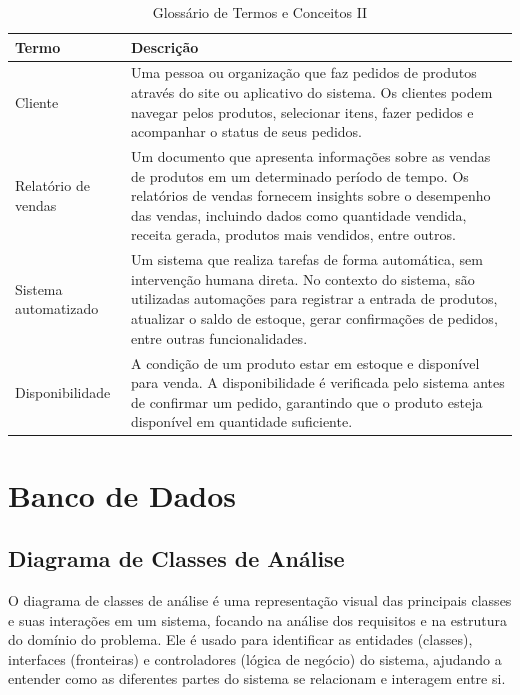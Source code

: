 \documentclass[
	12pt,				%
	openright,			%
	twoside,			%
	a4paper,			%
	english,			%
	brazil				%
	]{abntex2}
\begin{document}
\begin{table}[htb]
	\centering
	\caption{\label{tab:glossarioII}Glossário de Termos e Conceitos II}
	\begin{tabular}{|p{3.5cm}|p{10cm}|}
		\hline
		\textbf{Termo} & \textbf{Descrição} \\
			\hline
			Cliente & Uma pessoa ou organização que faz pedidos de produtos através do site ou aplicativo do sistema. Os clientes podem navegar pelos produtos, selecionar itens, fazer pedidos e acompanhar o status de seus pedidos. \\
			\hline
			Relatório de vendas & Um documento que apresenta informações sobre as vendas de produtos em um determinado período de tempo. Os relatórios de vendas fornecem insights sobre o desempenho das vendas, incluindo dados como quantidade vendida, receita gerada, produtos mais vendidos, entre outros. \\
			\hline
			Sistema automatizado & Um sistema que realiza tarefas de forma automática, sem intervenção humana direta. No contexto do sistema, são utilizadas automações para registrar a entrada de produtos, atualizar o saldo de estoque, gerar confirmações de pedidos, entre outras funcionalidades. \\
			\hline
			Disponibilidade & A condição de um produto estar em estoque e disponível para venda. A disponibilidade é verificada pelo sistema antes de confirmar um pedido, garantindo que o produto esteja disponível em quantidade suficiente. \\
			\hline
	\end{tabular}
\end{table}

\part{Banco de Dados}

\chapter{Diagrama de Classes de Análise}\label{diagrama_de_classes_def}

O diagrama de classes de análise é uma representação visual das principais classes e suas interações em um sistema, focando na análise dos requisitos e na estrutura do domínio do problema. Ele é usado para identificar as entidades (classes), interfaces (fronteiras) e controladores (lógica de negócio) do sistema, ajudando a entender como as diferentes partes do sistema se relacionam e interagem entre si.
\end{document}

